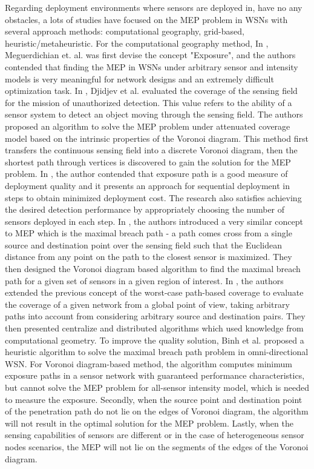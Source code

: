 \documentclass[final]{elsarticle}
\begin{document}
Regarding deployment environments where sensors are deployed in, have no any obstacles, a lots of studies have focused on the MEP problem in WSNs with several approach methods: computational geography, grid-based, heuristic/metaheuristic.
For the computational geography method, In \cite{meguerdichian2001exposure}, Meguerdichian et. al. was first devise the concept "Exposure", and the authors contended that finding the MEP in WSNs under arbitrary sensor and intensity models is very meaningful for network designs and an extremely difficult optimization task. In \cite{djidjev2010approximation}, Djidjev et al. evaluated the coverage of the sensing field for the mission of unauthorized detection. This value refers to the ability of a sensor system to detect an object moving through the sensing field. The authors proposed an algorithm to solve the MEP problem under attenuated coverage model based on the intrinsic properties of the Voronoi diagram. This method first transfers the continuous sensing field into a discrete Voronoi diagram, then the shortest path through vertices is discovered to gain the solution for the MEP problem. In \cite{b13}, the author contended that exposure path is a good measure of deployment quality and it presents an approach for sequential deployment in steps to obtain minimized deployment cost. The research also satisfies achieving the desired detection performance by appropriately choosing the number of sensors deployed in each step. In \cite{megerian2005worst}, the authors introduced a very similar concept to MEP which is the maximal breach path - a path comes cross from a single source and destination point over the sensing field such that the Euclidean distance from any point on the path to the closest sensor is maximized. They then designed the Voronoi diagram based algorithm to find the maximal breach path for a given set of sensors in a given region of interest. In \cite{lee2013best}, the authors  extended the previous concept of the worst-case path-based coverage to evaluate the coverage of a given network from a global point of view, taking arbitrary paths into account from considering arbitrary source and destination pairs. They then presented centralize and distributed algorithms which used knowledge from computational geometry. To improve the quality solution, Binh et al. \cite{binh2016heuristic} proposed a heuristic algorithm to solve the maximal breach path problem in omni-directional WSN. For Voronoi diagram-based method, the algorithm computes minimum exposure paths in a sensor network with guaranteed performance
characteristics, but cannot solve the MEP problem for all-sensor intensity model, which is needed to measure the exposure. Secondly,
when the source point and destination point of the penetration
path do not lie on the edges of Voronoi diagram, the algorithm
will not result in the optimal solution for the MEP problem. Lastly,
when the sensing capabilities of sensors are different or in the case of heterogeneous sensor nodes scenarios, the MEP will not lie on the segments of the edges of the Voronoi diagram.
\end{document}
